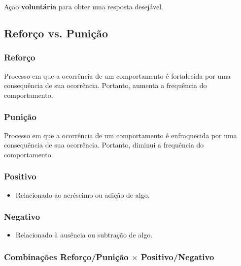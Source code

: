\documentclass{article}
\begin{document}
                Açao \textbf{voluntária} para obter uma resposta desejável.
            
        \subsection{Reforço vs. Punição}
        
            \subsubsection{Reforço}
            
                Processo em que a ocorrência de um comportamento é fortalecida por uma consequência de sua ocorrência. Portanto, aumenta a frequência do comportamento.
            
            \subsubsection{Punição}
            
                Processo em que a ocorrência de um comportamento é enfraquecida por uma consequência de sua ocorrência. Portanto, diminui a frequência do comportamento.
                
            \subsubsection{Positivo}
            
                \begin{itemize}
                    \item Relacionado ao acréscimo ou adição de algo.
                \end{itemize}
            
            \subsubsection{Negativo}
    
                \begin{itemize}
                    \item Relacionado à ausência ou subtração de algo.
                \end{itemize}
            
            \subsubsection{Combinações Reforço/Punição \texorpdfstring{$\times$}{TEXT} Positivo/Negativo}
            
\end{document}
